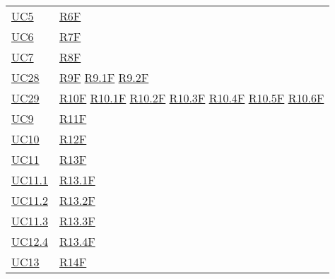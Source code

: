 \begin{center}
\begin{longtable}[!h]{m{50px} m{50px}}
        \hyperref[sec:UC5]{UC5}           & \hyperref[tab:RequisitiFunzionali]{R6F}    \\
        \hyperref[sec:UC6]{UC6}           & \hyperref[tab:RequisitiFunzionali]{R7F}    \\
        \hyperref[sec:UC7]{UC7}           & \hyperref[tab:RequisitiFunzionali]{R8F}    \\

        \hyperref[sec:UC28]{UC28}         & \hyperref[tab:RequisitiFunzionali]{R9F}
        \newline \hyperref[tab:RequisitiFunzionali]{R9.1F}
        \newline \hyperref[tab:RequisitiFunzionali]{R9.2F}                             \\

        \hyperref[sec:UC29]{UC29}         & \hyperref[tab:RequisitiFunzionali]{R10F}
        \newline \hyperref[tab:RequisitiFunzionali]{R10.1F}
        \newline \hyperref[tab:RequisitiFunzionali]{R10.2F}
        \newline \hyperref[tab:RequisitiFunzionali]{R10.3F}
        \newline \hyperref[tab:RequisitiFunzionali]{R10.4F}
        \newline \hyperref[tab:RequisitiFunzionali]{R10.5F}
        \newline \hyperref[tab:RequisitiFunzionali]{R10.6F}                            \\

        \hyperref[sec:UC9]{UC9}           & \hyperref[tab:RequisitiFunzionali]{R11F}   \\
        \hyperref[sec:UC10]{UC10}         & \hyperref[tab:RequisitiFunzionali]{R12F}   \\
        \hyperref[sec:UC11]{UC11}         & \hyperref[tab:RequisitiFunzionali]{R13F}   \\
        \hyperref[sec:UC11.1]{UC11.1}     & \hyperref[tab:RequisitiFunzionali]{R13.1F} \\
        \hyperref[sec:UC11.2]{UC11.2}     & \hyperref[tab:RequisitiFunzionali]{R13.2F} \\
        \hyperref[sec:UC11.3]{UC11.3}     & \hyperref[tab:RequisitiFunzionali]{R13.3F} \\
        \hyperref[sec:UC11.4]{UC12.4}     & \hyperref[tab:RequisitiFunzionali]{R13.4F} \\
        \hyperref[sec:UC13]{UC13}         & \hyperref[tab:RequisitiFunzionali]{R14F}   \\


\end{longtable}
\end{center}
